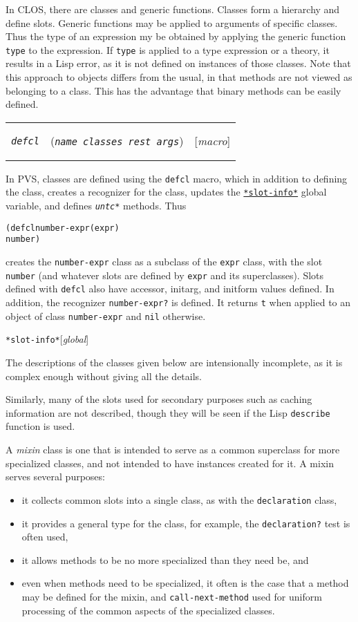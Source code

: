 \documentclass[12pt]{book}
\makeatletter
\newcommand{\indtt}[1]{\texttt{#1}\index{#1@\texttt{#1}}}  %
\def\htgt#1{\hypertarget{#1}{\indtt{#1}}}
\def\amprest{{\smaller\sc {\smaller\smaller \&}rest\ }}
\newenvironment{function}[3]%
{\par\noindent\begin{boxedminipage}{\textwidth}%
 \par\noindent\begin{tabularx}{\linewidth}{l>{\raggedright}Xr}%
 \functionhtgt{#1}&(\texttt{\textit{#2}})&[\emph{#3}]%
 \end{tabularx}\par\flushright\begin{minipage}{.97\textwidth}}
{\end{minipage}\end{boxedminipage}}
\newcommand{\functionnm}[1]{\texttt{\textit{#1}}}
\newcommand{\functionhtgt}[1]{\hypertarget{#1}{\functionnm{#1}}\index{#1@\functionnm{#1}|underline}}
\newenvironment{macro}[2]%
{\begin{function}{#1}{#2}{macro}}{\end{function}}
\newcommand{\classnm}[1]{\texttt{\textup{#1}}}
\newcommand{\globalnm}[1]{\texttt{\textup{#1}}}
\newcommand{\globalhln}[1]{\hyperlink{#1}{\globalnm{#1}}}
\newenvironment{globalvar}[1]%
{\par\noindent\begin{boxedminipage}{\textwidth}%
 \par\noindent\texttt{\htgt{#1}}\hfill[\emph{global}]%
 \par\flushright\begin{minipage}{.97\textwidth}}
{\end{minipage}\end{boxedminipage}}
\makeatother
\begin{document}
In CLOS, there are classes and generic functions.  Classes form a
hierarchy and define slots.  Generic functions may be applied to arguments
of specific classes.  Thus the type of an expression my be obtained by
applying the generic function \texttt{type} to the expression.  If
\texttt{type} is applied to a type expression or a theory, it results in a
Lisp error, as it is not defined on instances of those classes.  Note that
this approach to objects differs from the usual, in that methods are not
viewed as belonging to a class.  This has the advantage that binary
methods can be easily defined.

\begin{macro}{defcl}{name classes \amprest args}
In PVS, classes are defined using the \texttt{defcl} macro, which in
addition to defining the class, creates a recognizer for the class,
updates the \globalhln{*slot-info*} global variable, and defines
\functionnm{untc*} methods.  Thus
\begin{alltt}
  (defcl number-expr (expr)
    number)
\end{alltt}
creates the \texttt{number-expr} class as a subclass of the \texttt{expr}
class, with the slot \texttt{number} (and whatever slots are defined by
\texttt{expr} and its superclasses).  Slots defined with \texttt{defcl}
also have accessor, initarg, and initform values defined.  In addition,
the recognizer \texttt{number-expr?} is defined.  It returns \texttt{t}
when applied to an object of class \texttt{number-expr} and \texttt{nil}
otherwise.
\end{macro}

\begin{globalvar}{*slot-info*}
\end{globalvar}

The descriptions of the classes given below are intensionally incomplete,
as it is complex enough without giving all the details.  

Similarly, many of the slots used for secondary purposes such as caching
information are not described, though they will be seen if the
Lisp \texttt{describe} function is used.

A \emph{mixin} class is one that is intended to serve
as a common superclass for more specialized classes, and not intended to
have instances created for it.  A mixin serves several purposes:
\begin{itemize}
\item it collects common slots into a single class, as with the
\classnm{declaration} class,
\item it provides a general type for the class, for example, the
\texttt{declaration?} test is often used,
\item it allows methods to be no more specialized than they need be, and
\item even when methods need to be specialized, it often is the case that
a method may be defined for the mixin, and \texttt{call-next-method} used
for uniform processing of the common aspects of the specialized classes.
\end{itemize}
\end{document}
